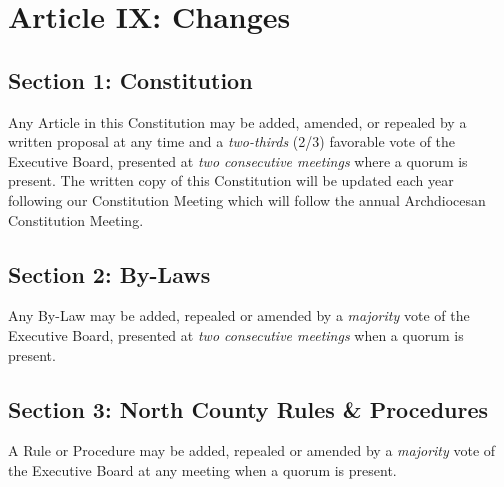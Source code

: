 \section{Article IX: Changes}
\label{sec:const-9}
\subsection{Section 1: Constitution}
\label{ssec:const-9-1}
Any Article in this Constitution may be added, amended, or repealed by a written proposal at any time and a {\em two-thirds} (2/3) favorable vote of the Executive Board, presented at {\em two consecutive meetings} where a quorum is present.  The written copy of this Constitution will be updated each year following our Constitution Meeting which will follow the annual Archdiocesan Constitution Meeting.  

\subsection{Section 2: By-Laws}
\label{ssec:const-9-2}
Any By-Law may be added, repealed or amended by a {\em majority} vote of the Executive Board, presented at {\em two consecutive meetings} when a quorum is present.

\subsection{Section 3: North County Rules \& Procedures}
\label{ssec:const-9-3}
A Rule or Procedure may be added, repealed or amended by a {\em majority} vote of the Executive Board at any meeting when a quorum is present.

